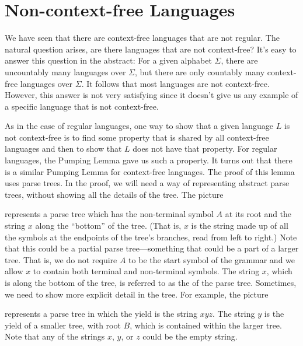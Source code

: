 \section{Non-context-free Languages}\label{S-grammars-4}

We have seen that there are context-free languages that are not
regular.  The natural question arises, are there languages that
are not context-free?  It's easy to answer this question in the
abstract:  For a given alphabet $\Sigma$, there are uncountably
many languages over $\Sigma$, but there are only
countably many context-free languages over $\Sigma$.  It follows
that most languages are not context-free.  However, this answer
is not very satisfying since it doesn't give us any example of
a specific language that is not context-free.

As in the case of regular languages, one way to show that
a given language $L$ is not context-free is to find some property
that is shared by all context-free languages and then to show that
$L$ does not have that property.  For regular languages, the
Pumping Lemma gave us such a property.  It turns out that
there is a similar Pumping Lemma for context-free languages.
The proof of this lemma uses parse trees.  In the proof, we
will need a way of representing abstract parse trees, without
showing all the details of the tree.  The picture

\medskip
\centerline{}
\smallskip

\noindent represents a parse tree which has the non-terminal symbol
$A$ at its root and the string $x$ along the ``bottom'' of the tree.
(That is, $x$ is the string made up of all the symbols at the
endpoints of the tree's branches, read from left to right.)  Note that
this could be a partial parse tree---something that could be a part of a
larger tree.  That is, we do not require $A$ to be the start symbol
of the grammar and we allow $x$ to contain both terminal and
non-terminal symbols.  The string $x$, which is along the bottom
of the tree, is referred to as the 
of the parse tree.  Sometimes, we need to show more explicit detail in
the tree.  For example, the picture

\medskip
\centerline{}

\noindent represents a parse tree in which the yield is the
string $xyz$.  The string $y$ is the yield of a smaller tree, with
root $B$, which is contained within the larger tree.
Note that any of the strings $x$, $y$, or $z$ could be the
empty string.  

